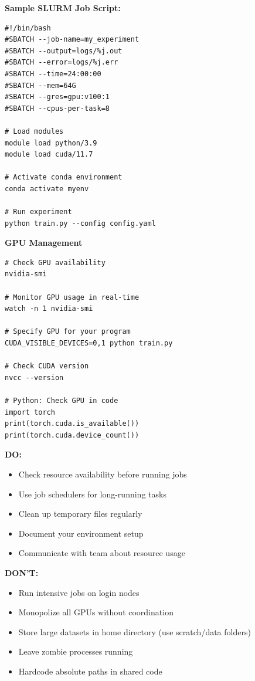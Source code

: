 \documentclass[11pt,a4paper]{article}
\begin{document}
\textbf{Sample SLURM Job Script:}

\begin{lstlisting}[style=bashstyle, caption=job\_script.sh]
#!/bin/bash
#SBATCH --job-name=my_experiment
#SBATCH --output=logs/%j.out
#SBATCH --error=logs/%j.err
#SBATCH --time=24:00:00
#SBATCH --mem=64G
#SBATCH --gres=gpu:v100:1
#SBATCH --cpus-per-task=8

# Load modules
module load python/3.9
module load cuda/11.7

# Activate conda environment
conda activate myenv

# Run experiment
python train.py --config config.yaml
\end{lstlisting}

\textbf{GPU Management}

\begin{lstlisting}[style=bashstyle]
# Check GPU availability
nvidia-smi

# Monitor GPU usage in real-time
watch -n 1 nvidia-smi

# Specify GPU for your program
CUDA_VISIBLE_DEVICES=0,1 python train.py

# Check CUDA version
nvcc --version

# Python: Check GPU in code
import torch
print(torch.cuda.is_available())
print(torch.cuda.device_count())
\end{lstlisting}

\begin{tcolorbox}[colback=red!5,colframe=red!40,title={Server Etiquette}]
\textbf{DO:}
\begin{itemize}
    \item Check resource availability before running jobs
    \item Use job schedulers for long-running tasks
    \item Clean up temporary files regularly
    \item Document your environment setup
    \item Communicate with team about resource usage
\end{itemize}

\textbf{DON'T:}
\begin{itemize}
    \item Run intensive jobs on login nodes
    \item Monopolize all GPUs without coordination
    \item Store large datasets in home directory (use scratch/data folders)
    \item Leave zombie processes running
    \item Hardcode absolute paths in shared code
\end{itemize}
\end{tcolorbox}
\end{document}
